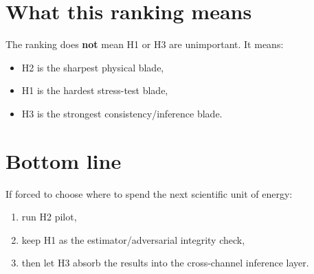 \documentclass[reprint,amsmath,amssymb,aps,showkeys]{revtex4-2}
\begin{document}
\section*{What this ranking means}
The ranking does \textbf{not} mean H1 or H3 are unimportant. It means:
\begin{itemize}
    \item H2 is the sharpest physical blade,
    \item H1 is the hardest stress-test blade,
    \item H3 is the strongest consistency/inference blade.
\end{itemize}

\section*{Bottom line}
If forced to choose where to spend the next scientific unit of energy:
\begin{enumerate}
    \item run H2 pilot,
    \item keep H1 as the estimator/adversarial integrity check,
    \item then let H3 absorb the results into the cross-channel inference layer.
\end{enumerate}
\end{document}
